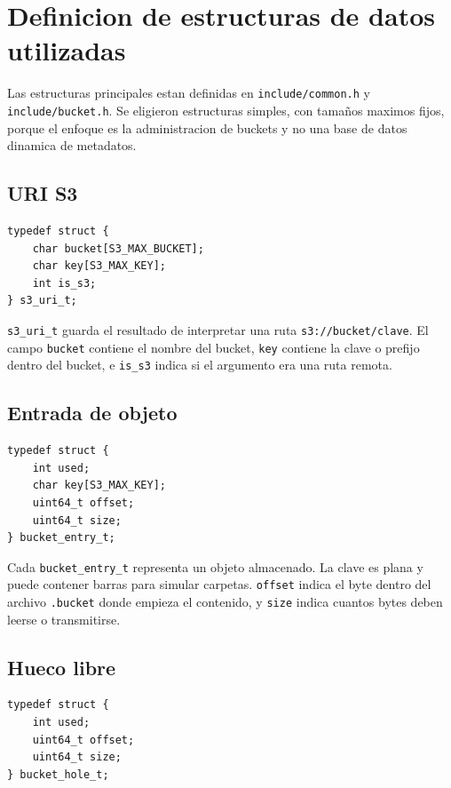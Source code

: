 \documentclass[12pt,letterpaper]{article}
\begin{document}
\section{Definicion de estructuras de datos utilizadas}

Las estructuras principales estan definidas en \texttt{include/common.h} y
\texttt{include/bucket.h}. Se eligieron estructuras simples, con tama\~{n}os maximos
fijos, porque el enfoque es la administracion de buckets y no una base de datos dinamica de metadatos.

\subsection{URI S3}

\begin{lstlisting}[style=cstyle]
typedef struct {
    char bucket[S3_MAX_BUCKET];
    char key[S3_MAX_KEY];
    int is_s3;
} s3_uri_t;
\end{lstlisting}

\texttt{s3\_uri\_t} guarda el resultado de interpretar una ruta
\texttt{s3://bucket/clave}. El campo \texttt{bucket} contiene el nombre del bucket,
\texttt{key} contiene la clave o prefijo dentro del bucket, e \texttt{is\_s3}
indica si el argumento era una ruta remota.

\subsection{Entrada de objeto}

\begin{lstlisting}[style=cstyle]
typedef struct {
    int used;
    char key[S3_MAX_KEY];
    uint64_t offset;
    uint64_t size;
} bucket_entry_t;
\end{lstlisting}

Cada \texttt{bucket\_entry\_t} representa un objeto almacenado. La clave es plana y
puede contener barras para simular carpetas. \texttt{offset} indica el byte dentro
del archivo \texttt{.bucket} donde empieza el contenido, y \texttt{size} indica
cuantos bytes deben leerse o transmitirse.

\subsection{Hueco libre}

\begin{lstlisting}[style=cstyle]
typedef struct {
    int used;
    uint64_t offset;
    uint64_t size;
} bucket_hole_t;
\end{lstlisting}
\end{document}
